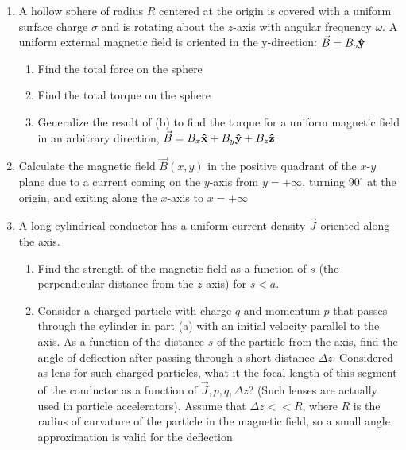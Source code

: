 \begin{enumerate}

  \item A hollow sphere of radius $R$ centered at the origin is covered with a uniform surface charge $\sigma$ and is rotating about the $z$-axis with angular frequency $\omega$.  A uniform external magnetic field is oriented in the y-direction: $\vec{B}=B_o\bold{\hat{y}}$

    \begin{enumerate}

      \item Find the total force on the sphere

      \item Find the total torque on the sphere

      \item Generalize the result of (b) to find the torque for a uniform magnetic field in an arbitrary direction, $\vec{B}=B_x\bold{\hat{x}}+B_y\bold{\hat{y}}+B_z\bold{\hat{z}}$

    \end{enumerate}

  \item Calculate the magnetic field $\vec{B}(x,y)$ in the positive quadrant of the $x$-$y$ plane due to a current coming on the $y$-axis from $y=+\infty$, turning $90^{\circ}$ at the origin, and exiting along the $x$-axis to $x=+\infty$

  \item A long cylindrical conductor has a uniform current density $\vec{J}$ oriented along the axis.

    \begin{enumerate}

      \item Find the strength of the magnetic field as a function of $s$ (the perpendicular distance from the $z$-axis) for $s<a$.

      \item Consider a charged particle with charge $q$ and momentum $p$ that passes through the cylinder in part (a) with an initial velocity parallel to the axis.  As a function of the distance $s$ of the particle from the axis, find the angle of deflection after passing through a short distance $\Delta z$. Considered as lens for such charged particles, what it the focal length of this segment of the conductor as a function of $\vec{J},p,q,\Delta z$? (Such lenses are actually used in particle accelerators). Assume that $\Delta z<<R$, where $R$ is the radius of curvature of the particle in the magnetic field, so a small angle approximation is valid for the deflection


\end{enumerate}
\end{enumerate}

